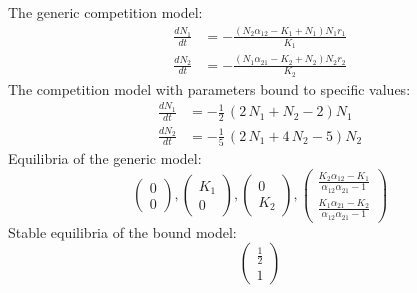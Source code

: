 \documentclass{article}
\begin{document}
The generic competition model:
\[\begin{align*}
\frac{dN_{1}}{dt} &= -\frac{{\left(N_{2} \alpha_{12} - K_{1} + N_{1}\right)} N_{1} r_{1}}{K_{1}}\\
\frac{dN_{2}}{dt} &= -\frac{{\left(N_{1} \alpha_{21} - K_{2} + N_{2}\right)} N_{2} r_{2}}{K_{2}}
\end{align*}\]
The competition model with parameters bound to specific values:
\[\begin{align*}
\frac{dN_{1}}{dt} &= -\frac{1}{2} \, {\left(2 \, N_{1} + N_{2} - 2\right)} N_{1}\\
\frac{dN_{2}}{dt} &= -\frac{1}{5} \, {\left(2 \, N_{1} + 4 \, N_{2} - 5\right)} N_{2}
\end{align*}\]
Equilibria of the generic model: 
\[ \left(\begin{array}{c}
  0\\
  0
\end{array}\right), \left(\begin{array}{c}
  K_{1}\\
  0
\end{array}\right), \left(\begin{array}{c}
  0\\
  K_{2}
\end{array}\right), \left(\begin{array}{c}
  \frac{K_{2} \alpha_{12} - K_{1}}{\alpha_{12} \alpha_{21} - 1}\\
  \frac{K_{1} \alpha_{21} - K_{2}}{\alpha_{12} \alpha_{21} - 1}
\end{array}\right)
\]Stable equilibria of the bound model: 
\[\left(\begin{array}{c}
  \frac{1}{2}\\
  1
\end{array}\right)
\]
\end{document}
